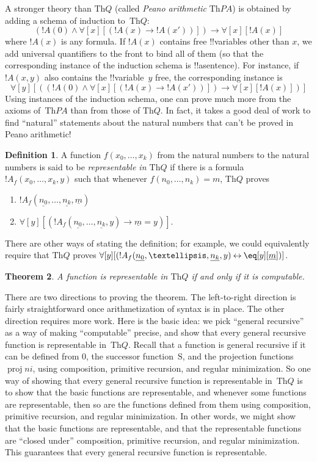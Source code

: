 \documentclass[10pt,a4paper]{article}
\theoremstyle{plain}
\newtheorem{thm}{Theorem}[section]
\theoremstyle{definition}
\newtheorem{defn}[thm]{Definition}
\theoremstyle{remark}
\newcommand*{\ollabel}[1]{\label{#1}}
\providecommand{\lif}{\mathbin{\rightarrow}}
\providecommand{\lforall}{\mathord{\forall}}
\providecommand{\Obj}{}
\providecommand{\Th}{\ensuremath{\mathrm{Th}}}
\providecommand{\num}[1]{\underline{#1}}
\providecommand{\Zero}{\ensuremath{0}}
\providecommand{\Succ}{\ensuremath{\mathrm{S}}}
\providecommand{\Proj}{\operatorname{proj}}
\providecommand{\liff}{\mathbin{\leftrightarrow}}
\begin{document}
A stronger theory than $\Th{Q}$ (called \emph{Peano arithmetic} $\Th{PA}$)
is obtained by adding a schema of induction to~$\Th{Q}$:
\[
(!A(\Obj 0) \land \lforall[x][(!A(x) \lif !A(x'))]) \lif \lforall[x][!A(x)]
\]
where $!A(x)$ is any formula. If $!A(x)$ contains free !!{variable}s
other than $x$, we add universal quantifiers to the front to bind all
of them (so that the corresponding instance of the induction schema is
!!a{sentence}). For instance, if $!A(x, y)$ also contains the
!!{variable}~$y$ free, the corresponding instance is
\[
\lforall[y][((!A(\Obj 0) \land \lforall[x][(!A(x) \lif !A(x'))]) \lif
  \lforall[x][!A(x)])]
\]
Using instances of the induction schema, one can prove much more from
the axioms of~$\Th{PA}$ than from those of $\Th{Q}$. In fact, it takes
a good deal of work to find ``natural'' statements about the natural
numbers that can't be proved in Peano arithmetic!{}

\begin{defn}
\ollabel{defn:representable-fn}
  A function $f(x_0,\ldots,x_k)$ from the natural numbers to
  the natural numbers is said to be {\em representable in $\Th{Q}$} if
  there is a formula $!A_f(x_0,\dots,x_k,y)$ such that whenever
  $f(n_0,\dots,n_k) = m$, $\Th{Q}$ proves
\begin{enumerate}
\item\ollabel{defn:rep:a} $!A_f(\num{n_0}, \dots, \num{n_k}, \num{m})$
\item\ollabel{defn:rep:b} $\lforall[y][(!A_f(\num{n_0}, \dots,
\num{n_k}, y) \lif \num{m} = y)]$.
\end{enumerate}
\end{defn}

There are other ways of stating the definition; for example, we could
equivalently require that $\Th{Q}$ proves $\lforall[y][(!A_f(\num{n_0}, \dots,
\num{n_k}, y) \liff \eq[y][\num{m}])]$.

\begin{thm}
\ollabel{thm:representable-iff-comp}
A function is representable in $\Th{Q}$ if and only if it is computable.
\end{thm}

There are two directions to proving the theorem. The left-to-right
direction is fairly straightforward once arithmetization of syntax is
in place. The other direction requires more work.  Here is the basic
idea: we pick ``general recursive'' as a way of making ``computable''
precise, and show that every general recursive function is
representable in~$\Th{Q}$. Recall that a function is general recursive
if it can be defined from $\Zero$, the successor function~$\Succ$, and the
projection functions~$\Proj{n}{i}$, using composition, primitive recursion,
and regular minimization. So one way of showing that every general
recursive function is representable in~$\Th{Q}$ is to show that the
basic functions are representable, and whenever some functions are
representable, then so are the functions defined from them using
composition, primitive recursion, and regular minimization. In other
words, we might show that the basic functions are representable, and
that the representable functions are ``closed under'' composition,
primitive recursion, and regular minimization.  This guarantees that
every general recursive function is representable.
\end{document}
